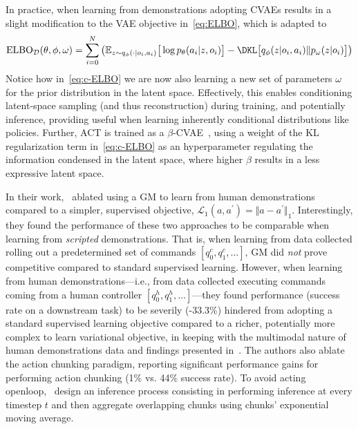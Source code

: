 In practice, when learning from demonstrations adopting CVAEs results in a slight modification to the VAE objective in~\ref{eq:ELBO}, which is adapted to
\begin{align}\label{eq:c-ELBO}
    \text{ELBO}_{\mathcal D}(\theta, \phi, \omega) = \sum_{i=0}^{N} \left(
            \mathbb{E}_{z \sim q_\phi(\cdot \vert o_i, a_i)} \big[ \log p_\theta(a_i \vert z, o_i) \big]
        - \DKL \big[ q_\phi(z \vert o_i, a_i) \Vert p_\omega(z \vert o_i) \big]
        \right)
\end{align}
Notice how in~\ref{eq:c-ELBO} we are now also learning a new set of parameters \( \omega \) for the prior distribution in the latent space.
Effectively, this enables conditioning latent-space sampling (and thus reconstruction) during training, and potentially inference, providing useful when learning inherently conditional distributions like policies.
Further, ACT is trained as a \( \beta\)-CVAE~\citep{higgins2017beta}, using a weight of the KL regularization term in~\ref{eq:c-ELBO} as an hyperparameter regulating the information condensed in the latent space, where higher \( \beta \) results in a less expressive latent space.

In their work,~\citet{zhaoLearningFineGrainedBimanual2023} ablated using a GM to learn from human demonstrations compared to a simpler, supervised objective, \( \mathcal L_1(a,a^\prime) = \Vert a - a^\prime \Vert_1 \).
Interestingly, they found the performance of these two approaches to be comparable when learning from \emph{scripted} demonstrations.
That is, when learning from data collected rolling out a predetermined set of commands \( [q^c_0, q^c_1, \dots] \), GM did \emph{not} prove competitive compared to standard supervised learning.
However, when learning from human demonstrations---i.e., from data collected executing commands coming from a human controller \( [q^h_0, q^h_1, \dots] \)---they found performance (success rate on a downstream task) to be severily (-33.3\%) hindered from adopting a standard supervised learning objective compared to a richer, potentially more complex to learn variational objective, in keeping with the multimodal nature of human demonstrations data and findings presented in~\citet{florenceImplicitBehavioralCloning2022}.
The authors also ablate the action chunking paradigm, reporting significant performance gains for performing action chunking (1\% vs. 44\% success rate).
To avoid acting openloop,~\citet{zhaoLearningFineGrainedBimanual2023} design an inference process consisting in performing inference at every timestep \( t \) and then aggregate overlapping chunks using chunks' exponential moving average.

